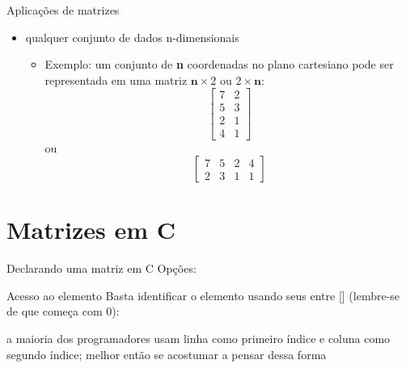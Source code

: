\documentclass[portuguese,10pt,xcolor=table]{bredelebeamer}
\begin{document}
	\begin{frame}{Aplicações de matrizes}
		\begin{itemize}
			\item qualquer conjunto de dados n-dimensionais
				\begin{itemize}
					\item Exemplo: um conjunto de \textbf{n} coordenadas no plano cartesiano pode ser representada em uma matriz $\textbf{n} \times 2$ ou $2 \times \textbf{n}$:
						$$
						\begin{bmatrix}
							7 & 2            \\[0.3em]
							5 & 3            \\[0.3em]
							2 & 1            \\[0.3em]
							4           & 1
						\end{bmatrix}
						$$
						ou 
						$$
						\begin{bmatrix}
							7 & 5 & 2 & 4            \\[0.3em]
							2 & 3 & 1 & 1
						\end{bmatrix}
						$$
				\end{itemize}
		\end{itemize}
	\end{frame}
		
	
\section{Matrizes em C}

	\begin{frame}[c]
		\begin{center}
			\structure{\large \insertsection}
		\end{center}
	\end{frame} 

    \begin{frame}{Declarando uma matriz em C} 
		Opções:
			
	\end{frame}

    \begin{frame}{Acesso ao elemento} 
		Basta identificar o elemento usando seus  entre [] (lembre-se de que começa com 0):
			
			\bcattention a maioria dos programadores usam linha como primeiro índice e coluna como segundo índice; melhor então se acostumar a pensar dessa forma
	\end{frame}
\end{document}
